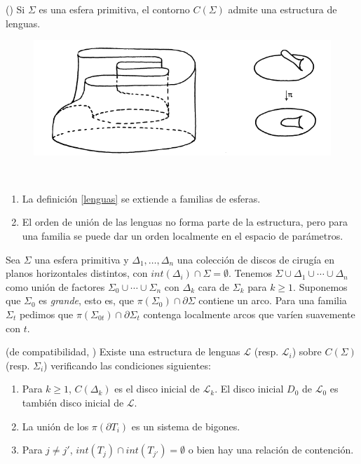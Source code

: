 \documentclass[twoside, 11pt]{article}
\begin{document}
\begin{teorema}(\cite[3.3]{Bo})
Si $\Sigma$ es una esfera primitiva, el contorno $C(\Sigma)$ admite una estructura de lenguas. 
\end{teorema}

\begin{figure}[h!]
\includegraphics[scale=0.6]{contour}
\end{figure}

\begin{nota}\
\begin{enumerate}
\item La definición \ref{lenguas} se extiende a familias de esferas.
\item El orden de unión de las lenguas no forma parte de la estructura, pero para una familia se puede dar un orden localmente en el espacio de parámetros.  
\end{enumerate}
\end{nota}

Sea $\Sigma$ una esfera primitiva y $\Delta_1,\dots, \Delta_n$ una colección de discos de cirugía en planos horizontales distintos, con $int(\Delta_i)\cap\Sigma=\emptyset$. Tenemos $\Sigma\cup\Delta_1\cup\cdots\cup\Delta_n$ como unión de factores $\Sigma_0\cup\cdots\cup \Sigma_n$ con $\Delta_k$ cara de $\Sigma_k$ para $k\geq 1$. Suponemos que $\Sigma_0$ es \emph{grande}, esto es, que $\pi(\Sigma_0)\cap\partial\Sigma$ contiene un arco. Para una familia $\Sigma_t$ pedimos que $\pi(\Sigma_{0t})\cap\partial\Sigma_t$ contenga localmente arcos que varíen suavemente con $t$.

\begin{teorema}(de compatibilidad, \cite[Proposición 5.2]{Ha})\label{3.5}
Existe una estructura de lenguas $\mathcal{L}$ (resp. $\mathcal{L}_i$) sobre $C(\Sigma)$ (resp. $\Sigma_i$) verificando las condiciones siguientes:
\begin{enumerate}
\item Para $k\geq 1$, $C(\Delta_k)$ es el disco inicial de $\mathcal{L}_k$. El disco inicial $D_0$ de $\mathcal{L}_0$ es también disco inicial de $\mathcal{L}$.
\item La unión de los $\pi(\partial T_i)$ es un sistema de bigones.
\item Para $j\neq j'$, $int(T_j)\cap int(T_{j'})=\emptyset$ o bien hay una relación de contención. 
\end{enumerate}
\end{teorema}
\end{document}
